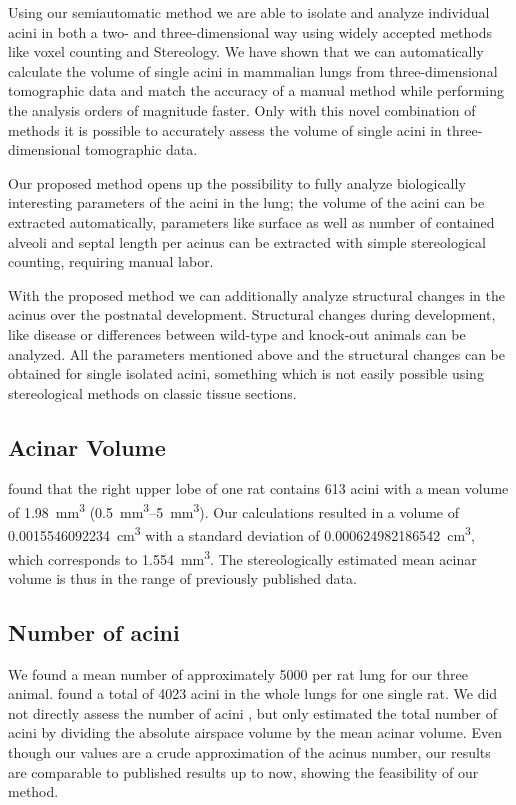 \documentclass[twoside,paper=a4,abstract=true,english,DIV=calc]{scrartcl}
\newcommand{\volume}{0.0015546092234} %
\newcommand{\std}{0.000624982186542} %
\begin{document}
Using our semiautomatic method we are able to isolate and analyze individual acini in both a two- and three-dimensional way using widely accepted methods like voxel counting and Stereology. We have shown that we can automatically calculate the volume of single acini in mammalian lungs from three-dimensional tomographic data and match the accuracy of a manual method while performing the analysis orders of magnitude faster. Only with this novel combination of methods it is possible to accurately assess the volume of single acini in three-dimensional tomographic data.

Our proposed method opens up the possibility to fully analyze biologically interesting parameters of the acini in the lung; the volume of the acini can be extracted automatically, parameters like surface as well as number of contained alveoli and septal length per acinus can be extracted with simple stereological counting, requiring manual labor.

With the proposed method we can additionally analyze structural changes in the acinus over the postnatal development. Structural changes during development, like disease or differences between wild-type and knock-out animals can be analyzed. All the parameters mentioned above and the structural changes can be obtained for single isolated acini, something which is not easily possible using stereological methods on classic tissue sections.

\subsection{Acinar Volume}
\citet[Table 1]{Rodriguez1987} found that the right upper lobe of one rat contains 613 acini with a mean volume of \SI{1.98}{\milli\meter\cubed} (\SIrange{0.5}{5}{\milli\meter\cubed}). Our calculations resulted in a volume of \SI{\volume}{\cubic\centi\meter} with a standard deviation of \SI{\std}{\cubic\centi\meter}, which corresponds to \SI{1.554}{\cubic\milli\meter}. The stereologically estimated mean acinar volume is thus in the range of previously published data.

\subsection{Number of acini}
We found a mean number of approximately 5000 per rat lung for our three animal. \citet[page 146]{Rodriguez1987} found a total of 4023 acini in the whole lungs for one single rat. We did not directly assess the number of acini , but only estimated the total number of acini by dividing the absolute airspace volume  by the mean acinar volume. Even though our values are a crude approximation of the acinus number, our results are comparable to published results up to now, showing the feasibility of our method.
\end{document}
